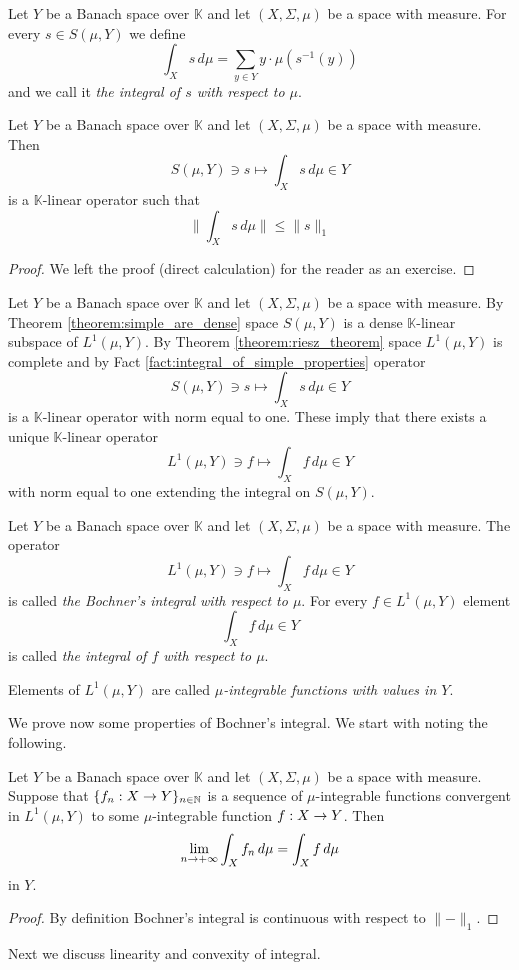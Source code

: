 \begin{definition}
    Let $Y$ be a Banach space over $\mathbb{K}$ and let $(X,\Sigma,\mu)$ be a space with measure. For every $s \in S(\mu, Y)$ we define
    $$\int_X s\,d\mu = \sum_{y\in Y}y\cdot \mu\left(s^{-1}(y)\right)$$
    and we call it \textit{the integral of $s$ with respect to $\mu$}.
\end{definition}

\begin{fact}\label{fact:integral_of_simple_properties}
    Let $Y$ be a Banach space over $\mathbb{K}$ and let $(X,\Sigma,\mu)$ be a space with measure. Then
    $$S(\mu, Y)\ni s \mapsto \int_Xs\,d\mu \in Y$$
    is a $\mathbb{K}$-linear operator such that
    $$\bigg\lVert\int_Xs\,d\mu\bigg\rVert \leq \lVert s \rVert_1$$
\end{fact}
\begin{proof}
    We left the proof (direct calculation) for the reader as an exercise.
\end{proof}
\noindent
Let $Y$ be a Banach space over $\mathbb{K}$ and let $(X,\Sigma,\mu)$ be a space with measure. By Theorem \ref{theorem:simple_are_dense} space $S(\mu, Y)$ is a dense $\mathbb{K}$-linear subspace of $L^1(\mu, Y)$. By Theorem \ref{theorem:riesz_theorem} space $L^1(\mu, Y)$ is complete and by Fact \ref{fact:integral_of_simple_properties} operator
$$S(\mu, Y)\ni s \mapsto \int_Xs\,d\mu \in Y$$
is a $\mathbb{K}$-linear operator with norm equal to one. These imply that there exists a unique $\mathbb{K}$-linear operator
$$L^1(\mu, Y)\ni f\mapsto \int_Xf\,d\mu\in Y$$
with norm equal to one extending the integral on $S(\mu, Y)$.

\begin{definition}
    Let $Y$ be a Banach space over $\mathbb{K}$ and let $(X,\Sigma,\mu)$ be a space with measure. The operator
    $$L^1(\mu, Y)\ni f\mapsto \int_Xf\,d\mu\in Y$$
    is called \textit{the Bochner's integral with respect to $\mu$}. For every $f\in L^1(\mu, Y)$ element
    $$\int_Xf\,d\mu\in Y$$
    is called \textit{the integral of $f$ with respect to $\mu$}.
\end{definition}

\begin{definition}
    Elements of $L^1(\mu,Y)$ are called \textit{$\mu$-integrable functions with values in $Y$}.
\end{definition}
\noindent
We prove now some properties of Bochner's integral. We start with noting the following.

\begin{corollary}\label{corollary:convergence_of_integral}
    Let $Y$ be a Banach space over $\mathbb{K}$ and let $(X,\Sigma,\mu)$ be a space with measure. Suppose that $\{f_n:X\rightarrow Y\}_{n\in {\mathbb N}}$ is a sequence of $\mu$-integrable functions convergent in $L^1(\mu, Y)$ to some $\mu$-integrable function $f:X\rightarrow Y$. Then
    $$\lim_{n\rightarrow +\infty}\int_Xf_n\,d\mu = \int_Xf\,d\mu$$
    in $Y$.
\end{corollary}
\begin{proof}
    By definition Bochner's integral is continuous with respect to $\lVert-\rVert_1$.
\end{proof}
\noindent
Next we discuss linearity and convexity of integral.

